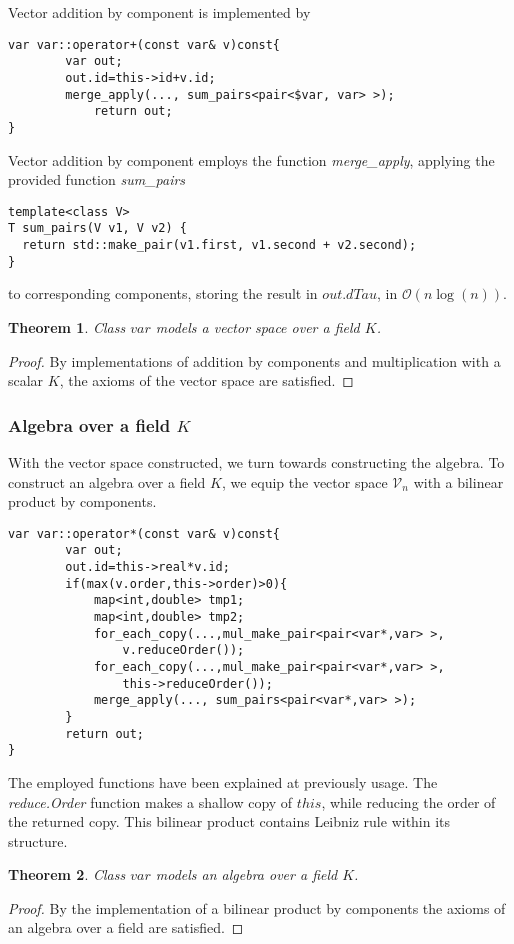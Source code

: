 \documentclass{article}
\newcommand{\VV}{\mathcal{V}}
\newtheorem{izrek}{Theorem}[section]
\begin{document}
Vector addition by component is implemented by 
\begin{lstlisting}
var var::operator+(const var& v)const{
		var out;
        out.id=this->id+v.id;
        merge_apply(..., sum_pairs<pair<$var, var> >);
            return out;
}
\end{lstlisting}
Vector addition by component employs the function \emph{merge\_apply}, applying the provided function \emph{sum\_pairs}
\begin{lstlisting}
template<class V>
T sum_pairs(V v1, V v2) {
  return std::make_pair(v1.first, v1.second + v2.second);
}
\end{lstlisting}
to corresponding components, storing the result in $out.dTau$, in $\mathcal{O}(n\log(n))$.

\begin{izrek}
Class $var$ models a vector space over a field $K$.
\end{izrek}
\begin{proof}
By implementations of addition by components and multiplication with a scalar $K$, the axioms of the vector space are satisfied.
\end{proof}

\subsubsection{Algebra over a field $K$}

With the vector space constructed, we turn towards constructing the algebra. To construct an algebra over a field $K$, we equip the vector space $\VV_n$ with a bilinear product by components.

\begin{lstlisting}
var var::operator*(const var& v)const{
		var out;
        out.id=this->real*v.id;
        if(max(v.order,this->order)>0){
        	map<int,double> tmp1;
        	map<int,double> tmp2;
        	for_each_copy(...,mul_make_pair<pair<var*,var> >, 
        		v.reduceOrder());
        	for_each_copy(...,mul_make_pair<pair<var*,var> >, 
        		this->reduceOrder());
        	merge_apply(..., sum_pairs<pair<var*,var> >);
        }
        return out;
}
\end{lstlisting}
The employed functions have been explained at previously usage. The \emph{reduce.Order} function makes a shallow copy of $this$, while reducing the order of the returned copy. This bilinear product contains Leibniz rule within its structure.

\begin{izrek}
Class $var$ models an algebra over a field $K$.
\end{izrek}
\begin{proof}
By the implementation of a bilinear product by components the axioms of an algebra over a field are satisfied.
\end{proof}
\end{document}
